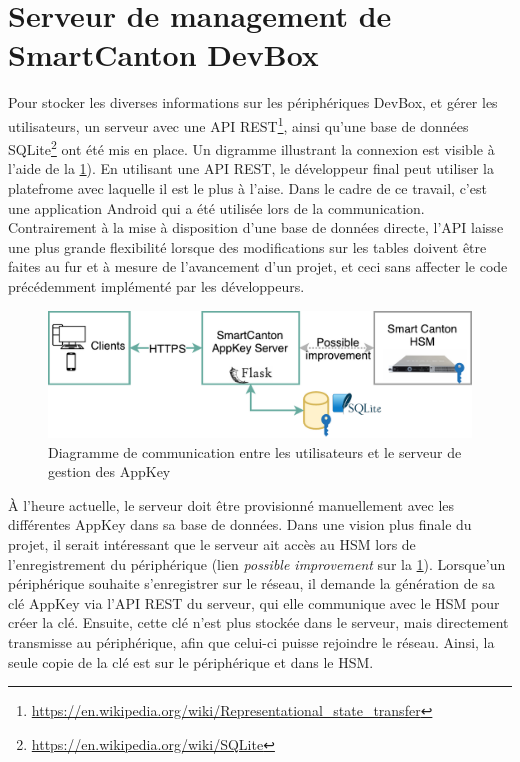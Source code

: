 \FloatBarrier
\newpage
\section{Serveur de management de SmartCanton DevBox}
\label{sec-soft_server}

Pour stocker les diverses informations sur les périphériques DevBox, et gérer les utilisateurs, un serveur avec une API REST\footnote{\url{https://en.wikipedia.org/wiki/Representational_state_transfer}}, ainsi qu'une base de données SQLite\footnote{\url{https://en.wikipedia.org/wiki/SQLite}} ont été mis en place. Un digramme illustrant la connexion est visible à l'aide de la \cref{fig-diagram_architecture_rest_api}).
En utilisant une API REST, le développeur final peut utiliser la platefrome avec laquelle il est le plus à l'aise. Dans le cadre de ce travail, c'est une application Android qui a été utilisée lors de la communication. Contrairement à la mise à disposition d'une base de données directe, l'API laisse une plus grande flexibilité lorsque des modifications sur les tables doivent être faites au fur et à mesure de l'avancement d'un projet, et ceci sans affecter le code précédemment implémenté par les développeurs.

\begin{figure}[ht!]
    \centering
    \includegraphics[width=1.0\textwidth]{Figures/Software/diagram_architecture_rest_api.pdf}
    \caption{Diagramme de communication entre les utilisateurs et le serveur de gestion des AppKey}
    \label{fig-diagram_architecture_rest_api}
\end{figure}

À l'heure actuelle, le serveur doit être provisionné manuellement avec les différentes AppKey dans sa base de données. Dans une vision plus finale du projet, il serait intéressant que le serveur ait accès au HSM lors de l'enregistrement du périphérique (lien \textit{possible improvement} sur la \cref{fig-diagram_architecture_rest_api}). Lorsque'un périphérique souhaite s'enregistrer sur le réseau, il demande la génération de sa clé AppKey via l'API REST du serveur, qui elle communique avec le HSM pour créer la clé. Ensuite, cette clé n'est plus stockée dans le serveur, mais directement transmisse au périphérique, afin que celui-ci puisse rejoindre le réseau. Ainsi, la seule copie de la clé est sur le périphérique et dans le HSM.

